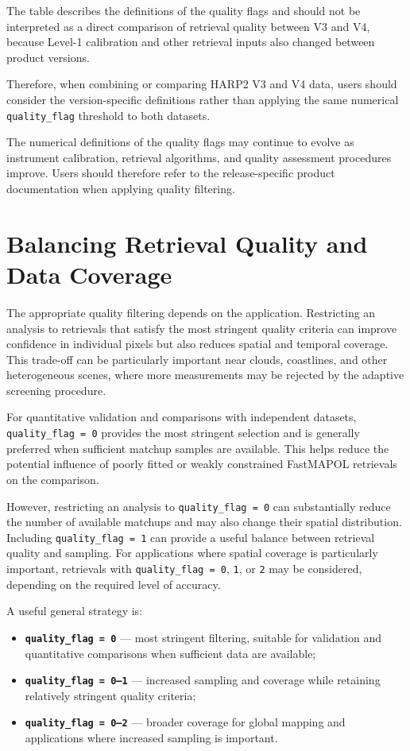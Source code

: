 \documentclass[
  11pt,
  letterpaper,
]{scrreprt}
\providecommand{\tightlist}{%
  \setlength{\itemsep}{0pt}\setlength{\parskip}{0pt}}
\begin{document}
The table describes the definitions of the quality flags and should not
be interpreted as a direct comparison of retrieval quality between V3
and V4, because Level-1 calibration and other retrieval inputs also
changed between product versions.

Therefore, when combining or comparing HARP2 V3 and V4 data, users
should consider the version-specific definitions rather than applying
the same numerical \texttt{quality\_flag} threshold to both datasets.

The numerical definitions of the quality flags may continue to evolve as
instrument calibration, retrieval algorithms, and quality assessment
procedures improve. Users should therefore refer to the release-specific
product documentation when applying quality filtering.

\section{Balancing Retrieval Quality and Data
Coverage}\label{balancing-retrieval-quality-and-data-coverage}

The appropriate quality filtering depends on the application.
Restricting an analysis to retrievals that satisfy the most stringent
quality criteria can improve confidence in individual pixels but also
reduces spatial and temporal coverage. This trade-off can be
particularly important near clouds, coastlines, and other heterogeneous
scenes, where more measurements may be rejected by the adaptive
screening procedure.

For quantitative validation and comparisons with independent datasets,
\texttt{quality\_flag\ =\ 0} provides the most stringent selection and
is generally preferred when sufficient matchup samples are available.
This helps reduce the potential influence of poorly fitted or weakly
constrained FastMAPOL retrievals on the comparison.

However, restricting an analysis to \texttt{quality\_flag\ =\ 0} can
substantially reduce the number of available matchups and may also
change their spatial distribution. Including
\texttt{quality\_flag\ =\ 1} can provide a useful balance between
retrieval quality and sampling. For applications where spatial coverage
is particularly important, retrievals with \texttt{quality\_flag\ =\ 0},
\texttt{1}, or \texttt{2} may be considered, depending on the required
level of accuracy.

A useful general strategy is:

\begin{itemize}
\tightlist
\item
  \textbf{\texttt{quality\_flag\ =\ 0}} --- most stringent filtering,
  suitable for validation and quantitative comparisons when sufficient
  data are available;
\item
  \textbf{\texttt{quality\_flag\ =\ 0–1}} --- increased sampling and
  coverage while retaining relatively stringent quality criteria;
\item
  \textbf{\texttt{quality\_flag\ =\ 0–2}} --- broader coverage for
  global mapping and applications where increased sampling is important.
\end{itemize}
\end{document}
